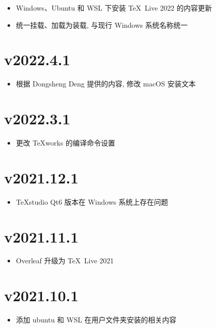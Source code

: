 \begin{itemize}
  \item Windows、Ubuntu 和 WSL 下安装 \TeX\ Live 2022 的内容更新
  \item 统一挂载、加载为装载, 与现行 Windows 系统名称统一
\end{itemize}

\section*{v2022.4.1}

\begin{itemize}
  \item 根据 Dongsheng Deng 提供的内容, 修改 macOS 安装文本
\end{itemize}

\section*{v2022.3.1}

\begin{itemize}
  \item 更改 \TeX works 的编译命令设置
\end{itemize}

\section*{v2021.12.1}

\begin{itemize}
  \item \TeX studio Qt6 版本在 Windows 系统上存在问题
\end{itemize}

\section*{v2021.11.1}

\begin{itemize}
  \item Overleaf 升级为 \TeX\ Live 2021
\end{itemize}

\section*{v2021.10.1}

\begin{itemize}
  \item 添加 ubuntu 和 WSL 在用户文件夹安装的相关内容
\end{itemize}

